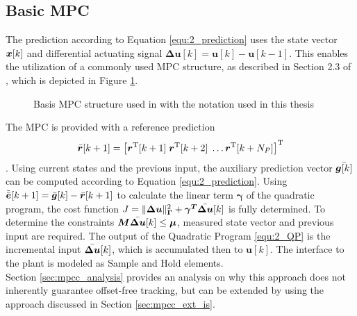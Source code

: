 \subsection{Basic MPC}\label{sec:mpcc_mpc_basic}
The prediction according to Equation \eqref{equ:2_prediction} uses the state vector ${\bm{x}}[k]$ and differential actuating signal $ \bm{\Delta u}[k] = \bm{u}[k]-\bm{u}[k-1] $. This enables the utilization of a commonly used MPC structure, as described in Section 2.3 of \cite{mpcCamacho}, which is depicted in Figure \ref{fig:OaC_MPC}. \\
\begin{figure}[h]
	\centering
	
	\caption{Basis MPC structure used in \cite{mpcCamacho} with the notation used in this thesis}
	\label{fig:OaC_MPC}
\end{figure}
The MPC is provided with a reference prediction $$\bar{\bm{r}}[k+1] = \left[ \bm{r}^{\mathrm{T}}[k+1]\; \bm{r}^{\mathrm{T}}[k+2] \; \hdots \bm{r}^{\mathrm{T}}[k+N_P] \right]^{\mathrm{T}}$$. Using current states and the previous input, the auxiliary prediction vector $\Bar{\bm{g} [k]}$ can be computed according to Equation \ref{equ:2_prediction}. Using $\Tilde{\Bar{\bm{e}}}[k+1] = \Bar{\bm{g}}[k] - \Bar{\bm{r}}[k+1]$ to calculate the linear term $\bm{\gamma}$ of the quadratic program, the cost function $J = \| \bm{{\Delta u}} \|_{\bm{\Gamma}}^2 + \bm{\gamma^T} \Bar{\bm{\Delta u}}[k]$ is fully determined. To determine the constraints $\bm{M} \Bar{\bm{\Delta u}}[k] \le \bm{\mu}$, measured state vector and previous input are required. The output of the Quadratic Program \eqref{equ:2_QP} is the incremental input $\Bar{\bm{\Delta u}}[k]$, which is accumulated then  to $\bm{u}[k]$. The interface to the plant is modeled as Sample and Hold elements. \\
Section \ref{sec:mpcc_analysis} provides an analysis on why this approach does not inherently guarantee offset-free tracking, but can be extended  by using the approach discussed in Section \ref{sec:mpcc_ext_is}.
 
